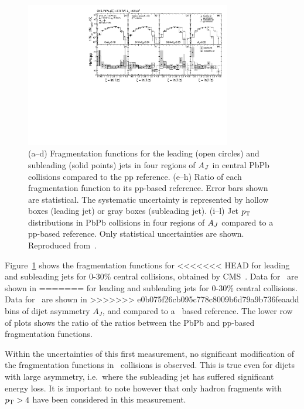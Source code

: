 \begin{figure}[!ht]
\begin{center}
\includegraphics[width=0.8\textwidth]{jetfigures/xsi_div_both_effv9_l100s40_0to12_dphi20eta20dr3pt4id1_cwt_ppDiv_gray.pdf}
\caption{(a--d) Fragmentation functions for the leading (open circles) and subleading (solid points) jets in four regions of $A_J$ in central PbPb collisions compared to the pp reference.
(e--h) Ratio of each fragmentation function to its pp-based reference.
Error bars shown are statistical. The systematic uncertainty is
represented by hollow boxes (leading jet) or gray boxes (subleading jet).
(i--l) Jet $\mbox{$p_{\mathrm{T}}$}$ distributions in PbPb collisions in four regions of $A_J$
compared to a pp-based reference. Only statistical uncertainties are shown.
Reproduced from~\cite{HIN-11-004}.
}

\label{fig:GR:CMS_jetFF}
\end{center}
\end{figure}
Figure~\ref{fig:GR:CMS_jetFF} shows the fragmentation functions for
<<<<<<< HEAD
for leading and subleading jets for 0-30\% central collisions, obtained
by CMS~\cite{HIN-11-004}. Data for \PbPb\ are shown in 
=======
for leading and subleading jets for 0-30\% central collisions. Data for \PbPb\ are shown in
>>>>>>> e0b075f26cb095c778c8009b6d79a9b736feaadd
bins of dijet asymmetry $A_J$, and compared to a \pp\ based reference.
The lower row of plots shows the ratio of the ratios between the PbPb
and pp-based fragmentation functions.

Within the uncertainties of this first measurement, no significant modification of
the fragmentation functions in \PbPb\ collisions is observed. This is true even for
dijets with large asymmetry, i.e.\ where the subleading jet has suffered significant
energy loss. It is important to note however that only hadron fragments with $\mbox{$p_{\mathrm{T}}$} > 4$\GeVc
have been considered in this measurement.

